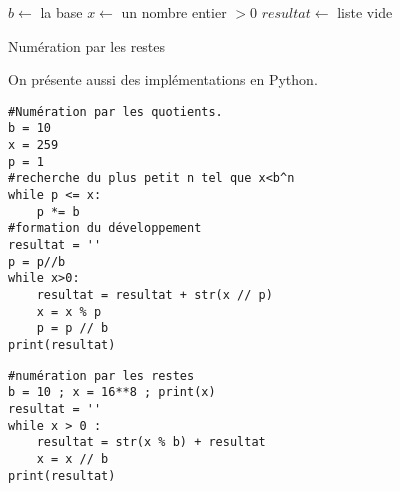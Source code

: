 \begin{algorithm}
 $b \leftarrow $ la base \;
 $x \leftarrow $ un nombre entier $>0$ \;
 $resultat \leftarrow$ liste vide \;
 \caption{Numération par les restes}
 \label{Numrem} 
\end{algorithm}

On présente aussi des implémentations en Python.
\begin{verbatim}
#Numération par les quotients.
b = 10
x = 259
p = 1
#recherche du plus petit n tel que x<b^n
while p <= x:
    p *= b
#formation du développement
resultat = ''
p = p//b
while x>0:
    resultat = resultat + str(x // p)
    x = x % p
    p = p // b
print(resultat) 
\end{verbatim}

\begin{verbatim}
#numération par les restes
b = 10 ; x = 16**8 ; print(x)
resultat = ''
while x > 0 :
    resultat = str(x % b) + resultat
    x = x // b
print(resultat)  
\end{verbatim}

\printindex

 